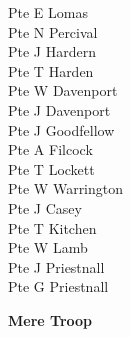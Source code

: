 \begin{multicols}{3}
  Pte E Lomas \\
  Pte N Percival \\
  Pte J Hardern \\
  Pte T Harden \\
  Pte W Davenport \\
  Pte J Davenport \\
  Pte J Goodfellow \\
  Pte A Filcock \\
  Pte T Lockett \\
  Pte W Warrington \\
  Pte J Casey \\
  Pte T Kitchen \\
  Pte W Lamb \\
  Pte J Priestnall \\
  Pte G Priestnall \\
\end{multicols}

\vspace*{10mm}

\begin{center}
  \Large
  \textbf{Mere Troop}
\end{center}

